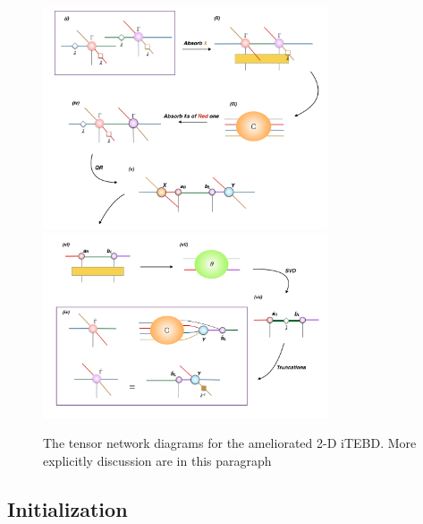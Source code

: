 	\begin{figure}[ht]
	\centering
	\includegraphics[width=0.75\textwidth]{figures/fig318.png}
	\includegraphics[width=0.75\textwidth]{figures/fig319.png}
	\caption[The tensor network diagrams for the ameliorated 2-D iTEBD with QR decompositiont]{The tensor network diagrams for the ameliorated 2-D iTEBD. More explicitly discussion are in	this paragraph}
	\label{fig318}
	\end{figure}

\subsection{Initialization}
\label{2doptInit}

